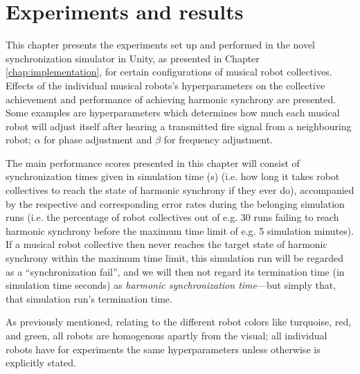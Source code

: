 \chapter{Experiments and results}
\label{chap:experiments_and_results}

This chapter presents the experiments set up and performed in the novel synchronization simulator in Unity, as presented in Chapter \ref{chap:implementation}, for certain configurations of musical robot collectives. Effects of the individual musical robots's hyperparameters on the collective achievement and performance of achieving harmonic synchrony are presented. Some examples are hyperparameters which determines how much each musical robot will adjust itself after hearing a transmitted fire signal from a neighbouring robot; $\alpha$ for phase adjustment and $\beta$ for frequency adjustment.

The main performance scores presented in this chapter will consist of synchronization times given in simulation time (s) (i.e. how long it takes robot collectives to reach the state of harmonic synchrony if they ever do), accompanied by the respective and corresponding error rates during the belonging simulation runs (i.e. the percentage of robot collectives out of e.g. 30 runs failing to reach harmonic synchrony before the maximum time limit of e.g. 5 simulation minutes). If a musical robot collective then never reaches the target state of harmonic synchrony within the maximum time limit, this simulation run will be regarded as a ``synchronization fail'', and we will then not regard its termination time (in simulation time seconds) as \textit{harmonic synchronization time}—but simply that, that simulation run's termination time.

As previously mentioned, relating to the different robot colors like turquoise, red, and green, all robots are homogenous apartly from the visual; all individual robots have for experiments the same hyperparameters unless otherwise is explicitly stated.






